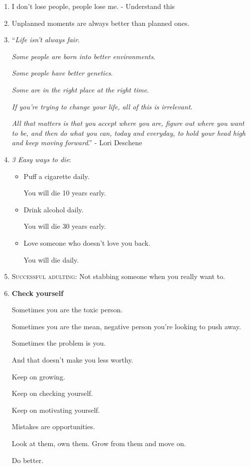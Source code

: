 \documentclass{article}
\begin{document}
\begin{enumerate}
	\item I don't lose people, people lose me. - Understand this
	\item Unplanned moments are always better than planned ones.
	\item ``\textit{Life isn't always fair}.
	
	\textit{Some people are born into better environments}.
	
	\textit{Some people have better genetics}.
	
	\textit{Some are in the right place at the right time}.
	
	\textit{If you're trying to change your life, all of this is irrelevant}.
	
	\textit{All that matters is that you accept where you are, figure out where you want to be, and then do what you can, today and everyday, to hold your head high and keep moving forward}.'' - Lori Deschene
	\item \textit{3 Easy ways to die}:
	\begin{itemize}
		\item Puff a cigarette daily.
		
		You will die 10 years early.
		\item Drink alcohol daily.
		
		You will die 30 years early.
		\item Love someone who doesn't love you back.
		
		You will die daily.
	\end{itemize}
	\item \textsc{Successful adulting}: Not stabbing someone when you really want to.
	\item \textbf{Check yourself}
	
	Sometimes you are the toxic person.
	
	Sometimes you are the mean, negative person you're looking to push away.
	
	Sometimes the problem is you.
	
	And that doesn't make you less worthy.
	
	Keep on growing.
	
	Keep on checking yourself.
	
	Keep on motivating yourself.
	
	Mistakes are opportunities.
	
	Look at them, own them. Grow from them and move on.
	
	Do better.
	

\end{enumerate}
\end{document}
